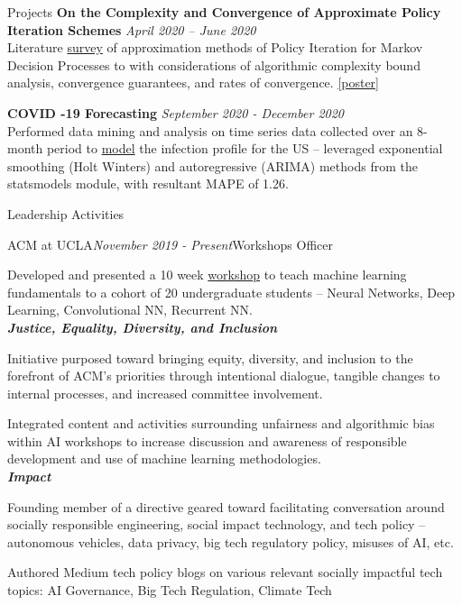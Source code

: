 \documentclass{resume}
\begin{document}
\begin{rSection}{Projects}
{\bf On the Complexity and Convergence of Approximate Policy Iteration Schemes} \hfill {\em April 2020 – June 2020}
\\Literature \href{https://github.com/joostinyi/ECE239AS/blob/master/RL_S20.pdf}{survey} of approximation methods of Policy Iteration
for Markov Decision Processes to with considerations of algorithmic complexity bound analysis, convergence guarantees, and rates of convergence. 
\href{https://github.com/joostinyi/ECE239AS/blob/master/Approximate-Policy-Iteration-Poster.pdf}{[poster]}

{\bf COVID -19 Forecasting} \hfill {\em September 2020 - December 2020}
\\Performed data mining and analysis on time series data collected over an 8-month period to \href{https://github.com/yashlala/cs-145-project}{model} the infection profile
for the US – leveraged exponential smoothing (Holt Winters) and autoregressive (ARIMA) methods from the statsmodels module, with resultant MAPE of 1.26.

\end{rSection}

\begin{rSection}{Leadership Activities}
    \begin{rSubsection}{ACM at UCLA}{\em November 2019 - Present}{Workshops Officer}{}
        \item Developed and presented a 10 week \href{https://www.youtube.com/playlist?list=PLPO7_kXilXFYGa-3ZpOXa7Z01ZYAtUh1U}{workshop}
        to teach machine learning fundamentals to a cohort of 20 undergraduate students – Neural Networks, Deep Learning, Convolutional NN, Recurrent NN.\\
        {\textbf{\em Justice, Equality, Diversity, and Inclusion}}
        \item Initiative purposed toward bringing equity, diversity, and inclusion to the forefront of ACM’s priorities through intentional dialogue,
        tangible changes to internal processes, and increased committee involvement.
        \item Integrated content and activities surrounding unfairness and algorithmic bias within AI workshops to increase discussion and awareness
        of responsible development and use of machine learning methodologies.\\
        {\textbf{\em Impact}}
        \item Founding member of a directive geared toward facilitating conversation around socially responsible engineering, social impact technology, and tech policy
        – autonomous vehicles, data privacy, big tech regulatory policy, misuses of AI, etc.
        \item Authored Medium tech policy blogs on various relevant socially impactful tech topics: AI Governance, Big Tech Regulation, Climate Tech
    \end{rSubsection}
\end{rSection}
\end{document}
